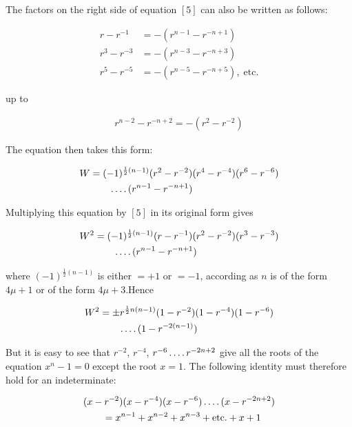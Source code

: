 
The factors on the right side of equation $[5]$ can also be written as follows:

\[
\begin{aligned}
r-r^{-1}&=-(r^{n-1}-r^{-n+1})\\
r^3-r^{-3}&=-(r^{n-3}-r^{-n+3})\\
r^5-r^{-5}&=-(r^{n-5}-r^{-n+5}),\;\text{etc.}
\end{aligned}
\]

up to

\[
\begin{aligned}
r^{n-2}-r^{-n+2}=-(r^2-r^{-2})
\end{aligned}
\]

The equation then takes this form:


\[
\begin{aligned}
W&=(-1)^{\frac12(n-1)}(r^2-r^{-2})(r^4-r^{-4})(r^6-r^{-6})\\&\qquad\mathinner{.\,.\,.\,.}(r^{n-1}-r^{-n+1})
\end{aligned}
\]

Multiplying this equation by $[5]$ in its original form gives

\[
\begin{aligned}
W^2&=(-1)^{\frac12(n-1)}(r-r^{-1})(r^2-r^{-2})(r^3-r^{-3})\\&\qquad\mathinner{.\,.\,.\,.}(r^{n-1}-r^{-n+1})
\end{aligned}
\]

where $(-1)^{\frac12(n-1)}$ is either $=+1$ or $=-1$, according as $n$ is of the form $4\mu+1$ or of the form $4\mu+3$.\quad Hence

\[
\begin{aligned}
W^2&=\pm r^{\frac12n(n-1)}(1-r^{-2})(1-r^{-4})(1-r^{-6})\\&\qquad\mathinner{.\,.\,.\,.}(1-r^{-2(n-1)})
\end{aligned}
\]

But it is easy to see that $r^{-2}$, $r^{-4}$, $r^{-6}\mathinner{.\,.\,.\,.} r^{-2n+2}$ give all the roots of the equation $x^n-1=0$ except the root $x=1$. The following identity must therefore hold for an indeterminate:

\[
\begin{aligned}
&(x-r^{-2})(x-r^{-4})(x-r^{-6})\mathinner{.\,.\,.\,.}(x-r^{-2n+2})\\&\qquad=x^{n-1}+x^{n-2}+x^{n-3}+\text{etc.}+x+1
\end{aligned}
\]

